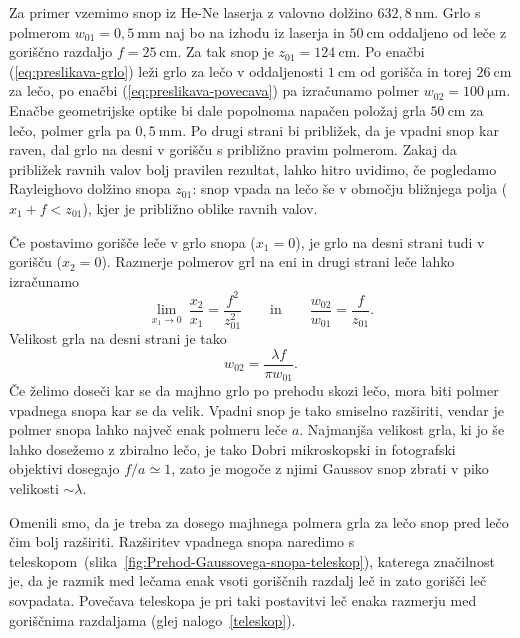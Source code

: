 Za primer vzemimo snop iz He-Ne laserja z valovno dolžino 
$632,8~\si{\nano\metre}$. Grlo s polmerom $w_{01}=0,5~\si{\milli\metre}$ naj bo 
na izhodu iz laserja in  $50~\si{\centi\metre}$ 
oddaljeno od leče z goriščno razdaljo $f=25~\si{\centi\metre}$.
Za tak snop je $z_{01}=124~\si{\centi\metre}$. Po enačbi (\ref{eq:preslikava-grlo})
leži grlo za lečo v oddaljenosti $1~\si{\centi\metre}$ od gorišča in torej $26~\si{\centi\metre}$ 
za lečo, po enačbi (\ref{eq:preslikava-povecava})
pa izračunamo polmer $w_{02}=100~\si{\micro\metre}$. Enačbe geometrijske optike bi
dale popolnoma napačen položaj grla $50~\si{\centi\metre}$ za lečo, polmer grla pa 
$0,5~\si{\milli\metre}$. Po drugi strani bi približek, da je vpadni
snop kar raven, dal grlo na desni v gorišču s približno pravim polmerom. Zakaj da približek ravnih 
valov bolj pravilen rezultat, lahko hitro uvidimo, če pogledamo
Rayleighovo dolžino snopa $z_{01}$: 
snop vpada na lečo še v območju bližnjega polja ($x_1 + f < z_{01}$), kjer 
je približno oblike ravnih valov. 

Če postavimo gorišče leče v grlo snopa ($x_{1}=0$), je grlo na
desni strani tudi v gorišču ($x_{2}=0$). Razmerje polmerov grl
na eni in drugi strani leče lahko izračunamo
\begin{equation}
\lim_{x_1 \to 0}~\frac{x_{2}}{x_{1}}=\frac{f^{2}}{z_{01}^{2}} \qquad \textrm{in} \qquad
\frac{w_{02}}{w_{01}}= \frac{f}{z_{01}}.
\end{equation}
Velikost grla na desni strani je tako
\begin{equation}
w_{02}=\frac{\lambda f}{\pi w_{01}}.
\end{equation}
Če želimo doseči kar se da majhno grlo po prehodu skozi lečo, mora biti polmer
vpadnega snopa kar se da velik. Vpadni snop je tako smiselno
razširiti, vendar je polmer snopa lahko največ enak polmeru leče $a$. 
Najmanjša velikost grla, ki jo še lahko dosežemo z zbiralno lečo, je tako 
Dobri mikroskopski in fotografski
objektivi dosegajo $f/a\simeq 1$, zato je mogoče z njimi Gaussov snop
zbrati v piko velikosti $\sim\lambda$. 

Omenili smo, da je treba za dosego majhnega polmera grla za lečo snop pred lečo čim bolj razširiti.
Razširitev vpadnega snopa naredimo s teleskopom~(slika~\ref{fig:Prehod-Gaussovega-snopa-teleskop}),
katerega značilnost je, da je razmik med lečama enak vsoti goriščnih razdalj leč in zato gorišči
leč sovpadata. Povečava teleskopa je pri taki postavitvi leč enaka razmerju med goriščnima razdaljama 
(glej nalogo~\ref{teleskop}).

